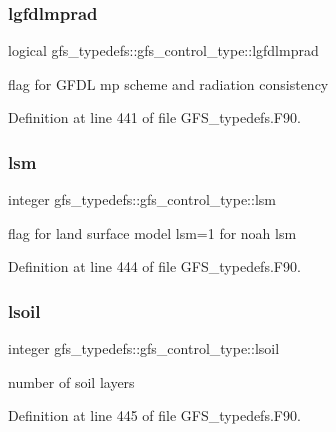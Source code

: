 \subsubsection{lgfdlmprad}
{\footnotesize\ttfamily logical gfs\+\_\+typedefs\+::gfs\+\_\+control\+\_\+type\+::lgfdlmprad}



flag for G\+F\+DL mp scheme and radiation consistency 



Definition at line 441 of file G\+F\+S\+\_\+typedefs.\+F90.

\mbox{\label{structgfs__typedefs_1_1gfs__control__type_a6d4d8f51a9b637c3fe6db2075b63ddbd}} 
\subsubsection{lsm}
{\footnotesize\ttfamily integer gfs\+\_\+typedefs\+::gfs\+\_\+control\+\_\+type\+::lsm}



flag for land surface model lsm=1 for noah lsm 



Definition at line 444 of file G\+F\+S\+\_\+typedefs.\+F90.

\mbox{\label{structgfs__typedefs_1_1gfs__control__type_a4b8e5cb55c6295ab8145c806cc63cd4f}} 
\subsubsection{lsoil}
{\footnotesize\ttfamily integer gfs\+\_\+typedefs\+::gfs\+\_\+control\+\_\+type\+::lsoil}



number of soil layers 



Definition at line 445 of file G\+F\+S\+\_\+typedefs.\+F90.

\mbox{\label{structgfs__typedefs_1_1gfs__control__type_a06c113659566c3065d8a5236cdf1e2d5}} 
